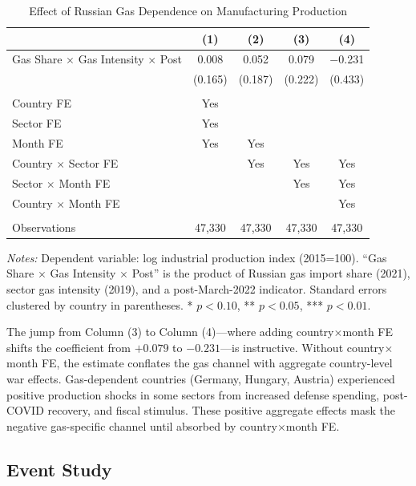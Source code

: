 \documentclass[12pt]{article}
\begin{document}
\begin{table}[H]
\centering
\caption{Effect of Russian Gas Dependence on Manufacturing Production}
\label{tab:main}
\begin{threeparttable}
\begin{tabular}{lcccc}
\toprule
& (1) & (2) & (3) & (4) \\
\midrule
Gas Share $\times$ Gas Intensity $\times$ Post & 0.008 & 0.052 & 0.079 & $-$0.231 \\
& (0.165) & (0.187) & (0.222) & (0.433) \\
\\
Country FE & Yes & & & \\
Sector FE & Yes & & & \\
Month FE & Yes & Yes & & \\
Country $\times$ Sector FE & & Yes & Yes & Yes \\
Sector $\times$ Month FE & & & Yes & Yes \\
Country $\times$ Month FE & & & & Yes \\
\\
Observations & 47,330 & 47,330 & 47,330 & 47,330 \\
\bottomrule
\end{tabular}
\begin{tablenotes}[flushleft]
\small
\item \textit{Notes:} Dependent variable: log industrial production index (2015=100). ``Gas Share $\times$ Gas Intensity $\times$ Post'' is the product of Russian gas import share (2021), sector gas intensity (2019), and a post-March-2022 indicator. Standard errors clustered by country in parentheses. * $p<0.10$, ** $p<0.05$, *** $p<0.01$.
\end{tablenotes}
\end{threeparttable}
\end{table}

The jump from Column (3) to Column (4)---where adding country$\times$month FE shifts the coefficient from $+0.079$ to $-0.231$---is instructive. Without country$\times$month FE, the estimate conflates the gas channel with aggregate country-level war effects. Gas-dependent countries (Germany, Hungary, Austria) experienced positive production shocks in some sectors from increased defense spending, post-COVID recovery, and fiscal stimulus. These positive aggregate effects mask the negative gas-specific channel until absorbed by country$\times$month FE.

\subsection{Event Study}
\end{document}
